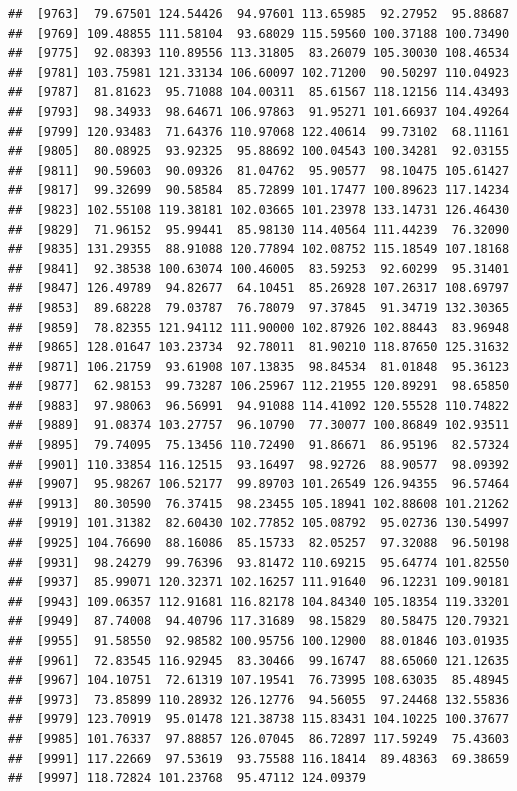 \documentclass[
]{article}
\begin{document}
\begin{verbatim}
##  [9763]  79.67501 124.54426  94.97601 113.65985  92.27952  95.88687
##  [9769] 109.48855 111.58104  93.68029 115.59560 100.37188 100.73490
##  [9775]  92.08393 110.89556 113.31805  83.26079 105.30030 108.46534
##  [9781] 103.75981 121.33134 106.60097 102.71200  90.50297 110.04923
##  [9787]  81.81623  95.71088 104.00311  85.61567 118.12156 114.43493
##  [9793]  98.34933  98.64671 106.97863  91.95271 101.66937 104.49264
##  [9799] 120.93483  71.64376 110.97068 122.40614  99.73102  68.11161
##  [9805]  80.08925  93.92325  95.88692 100.04543 100.34281  92.03155
##  [9811]  90.59603  90.09326  81.04762  95.90577  98.10475 105.61427
##  [9817]  99.32699  90.58584  85.72899 101.17477 100.89623 117.14234
##  [9823] 102.55108 119.38181 102.03665 101.23978 133.14731 126.46430
##  [9829]  71.96152  95.99441  85.98130 114.40564 111.44239  76.32090
##  [9835] 131.29355  88.91088 120.77894 102.08752 115.18549 107.18168
##  [9841]  92.38538 100.63074 100.46005  83.59253  92.60299  95.31401
##  [9847] 126.49789  94.82677  64.10451  85.26928 107.26317 108.69797
##  [9853]  89.68228  79.03787  76.78079  97.37845  91.34719 132.30365
##  [9859]  78.82355 121.94112 111.90000 102.87926 102.88443  83.96948
##  [9865] 128.01647 103.23734  92.78011  81.90210 118.87650 125.31632
##  [9871] 106.21759  93.61908 107.13835  98.84534  81.01848  95.36123
##  [9877]  62.98153  99.73287 106.25967 112.21955 120.89291  98.65850
##  [9883]  97.98063  96.56991  94.91088 114.41092 120.55528 110.74822
##  [9889]  91.08374 103.27757  96.10790  77.30077 100.86849 102.93511
##  [9895]  79.74095  75.13456 110.72490  91.86671  86.95196  82.57324
##  [9901] 110.33854 116.12515  93.16497  98.92726  88.90577  98.09392
##  [9907]  95.98267 106.52177  99.89703 101.26549 126.94355  96.57464
##  [9913]  80.30590  76.37415  98.23455 105.18941 102.88608 101.21262
##  [9919] 101.31382  82.60430 102.77852 105.08792  95.02736 130.54997
##  [9925] 104.76690  88.16086  85.15733  82.05257  97.32088  96.50198
##  [9931]  98.24279  99.76396  93.81472 110.69215  95.64774 101.82550
##  [9937]  85.99071 120.32371 102.16257 111.91640  96.12231 109.90181
##  [9943] 109.06357 112.91681 116.82178 104.84340 105.18354 119.33201
##  [9949]  87.74008  94.40796 117.31689  98.15829  80.58475 120.79321
##  [9955]  91.58550  92.98582 100.95756 100.12900  88.01846 103.01935
##  [9961]  72.83545 116.92945  83.30466  99.16747  88.65060 121.12635
##  [9967] 104.10751  72.61319 107.19541  76.73995 108.63035  85.48945
##  [9973]  73.85899 110.28932 126.12776  94.56055  97.24468 132.55836
##  [9979] 123.70919  95.01478 121.38738 115.83431 104.10225 100.37677
##  [9985] 101.76337  97.88857 126.07045  86.72897 117.59249  75.43603
##  [9991] 117.22669  97.53619  93.75588 116.18414  89.48363  69.38659
##  [9997] 118.72824 101.23768  95.47112 124.09379
\end{verbatim}
\end{document}

